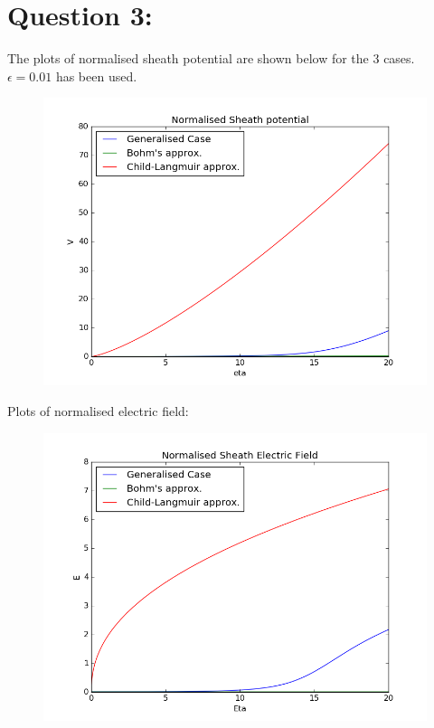 \documentclass[11pt, a4paper]{article}
\begin{document}
\section{Question 3:}
The plots of normalised sheath potential are shown below for the 3 cases. $\epsilon = 0.01$ has been used.
\begin{figure}[H]
 \centering
 \includegraphics[scale = 0.5]{Gen_Vnorm.png}
\end{figure}

Plots of normalised electric field:
\begin{figure}[H]
 \centering
 \includegraphics[scale = 0.5]{Gen_Enorm.png}
\end{figure}
\end{document}
